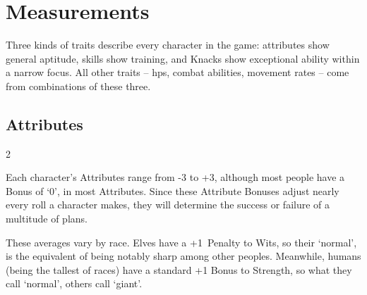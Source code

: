 \chapter{Measurements}
\label{measurements}

Three kinds of \glspl{trait} describe every character in the game: \glspl{attribute} show general aptitude, \glspl{skill} show training, and Knacks show exceptional ability within a narrow focus.
All other \glspl{trait} -- \glspl{hp}, combat abilities, movement rates -- come from combinations of these three.

\section{Attributes}
\label{randomAttributes}

\begin{multicols}{2}


\noindent
Each character's Attributes range from -3 to +3, although most people have a Bonus of `0', in most Attributes.
Since these Attribute Bonuses adjust nearly every roll a character makes, they will determine the success or failure of a multitude of plans.

These averages vary by race.
Elves have a +1~Penalty to Wits, so their `normal', is the equivalent of being notably sharp among other peoples.
Meanwhile, humans (being the tallest of races) have a standard +1 Bonus to Strength, so what they call `normal', others call `giant'.


\end{multicols}
